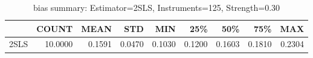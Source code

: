 \begin{table}[ht]
\centering
\caption{bias summary: Estimator=2SLS, Instruments=125, Strength=0.30}
\begin{tabular}{lrrrrrrrr}
\toprule
 & COUNT & MEAN & STD & MIN & 25\% & 50\% & 75\% & MAX \\
\midrule
2SLS & 10.0000 & 0.1591 & 0.0470 & 0.1030 & 0.1200 & 0.1603 & 0.1810 & 0.2304 \\
\bottomrule
\end{tabular}
\end{table}
